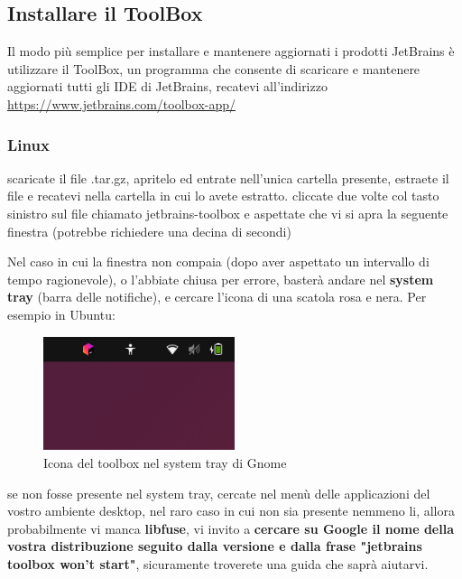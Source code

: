     \subsection{Installare il ToolBox}
        Il modo più semplice per installare e mantenere aggiornati i prodotti JetBrains è utilizzare il ToolBox, un programma che consente di scaricare e mantenere aggiornati 
        tutti gli IDE di JetBrains, recatevi all'indirizzo \url{https://www.jetbrains.com/toolbox-app/}

        \subsubsection{Linux}
            scaricate il file .tar.gz, apritelo ed entrate nell'unica cartella presente, estraete il file e recatevi nella cartella in cui lo avete estratto. cliccate due volte col tasto 
            sinistro sul file chiamato jetbrains-toolbox e aspettate che vi si apra la seguente finestra (potrebbe richiedere una decina di secondi)
            \begin{warningbox}
                Nel caso in cui la finestra non compaia (dopo aver aspettato un intervallo di tempo ragionevole), o l'abbiate chiusa per errore, 
                basterà andare nel \textbf{system tray} (barra delle notifiche), e cercare l'icona di una scatola rosa e nera. Per esempio in Ubuntu:
                \begin{figure}[H]
                    \centering
                    \graphicspath{{src/capitoli/04/img/}}
                    \includegraphics[width=0.5\textwidth]{barra-toolbox.png}
                    \caption{Icona del toolbox nel system tray di Gnome}
                    \label{fig:Icona del toolbox nel system tray di Gnome}
                \end{figure}
                se non fosse presente nel system tray, cercate nel menù delle applicazioni del vostro ambiente desktop, nel raro caso in cui non sia presente 
                nemmeno li, allora probabilmente vi manca \textbf{libfuse}, vi invito a \textbf{cercare su Google il nome della vostra distribuzione seguito dalla versione 
                e dalla frase "jetbrains toolbox won't start"}, sicuramente troverete una guida che saprà aiutarvi.
            \end{warningbox}            

